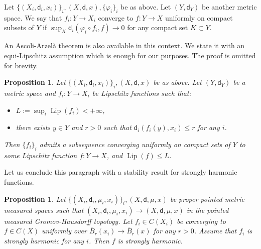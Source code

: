 \documentclass[JEP,XML,SOM,Unicode,published]{cedram}
\theoremstyle{plain}
\newtheorem{proposition}[theorem]{Proposition}
\theoremstyle{definition}
\let\phi\varphi
\DeclareMathOperator{\Lip}{Lip}
\newcommand{\dist}{\mathsf{d}}
\begin{document}
Let $\{(X_i,\dist_i,x_i)\}_i, (X,\dist,x),\{\phi_i\}_i$ be as above. Let $(Y,\dist_Y)$ be another metric space. We say that $f_i: Y\to X_i$ converge to $f: Y\to X$ uniformly on compact subsets of $Y$ if $\sup_K \dist_i(\phi_i \circ f_i,f) \to 0$ for any compact set $K \subset Y$.

An Ascoli-Arzelà theorem is also available in this context. We state it with an equi-Lipschitz assumption which is enough for our purposes. The proof is omitted for brevity.

\begin{proposition}\label{prop:AA2}
Let $\{(X_i,\dist_i,x_i)\}_i, (X,\dist,x)$ be as above. Let $(Y,\dist_Y)$ be a metric space and $f_i: Y\to X_i$ be Lipschitz functions such that:
\begin{itemize}
\item $L:=\sup_i \Lip(f_i) < +\infty$,
\item there exists $y\in Y$ and $r>0$ such that $\dist_i(f_i(y),x_i)\le r$ for any $i$.
\end{itemize} Then $\{f_i\}_i$ admits a subsequence converging uniformly on compact sets of $Y$ to some Lipschitz function $f:Y\to X$, and $\Lip(f) \le L$.
\end{proposition}

Let us conclude this paragraph with a stability result for strongly harmonic functions.

\begin{proposition}\label{prop:stabstrongharmonic}
Let $\{(X_i,\dist_i,\mu_i,x_i)\}_i, (X,\dist,\mu,x)$ be proper pointed metric measured spaces such that $(X_i,\dist_i,\mu_i,x_i) \to (X,\dist,\mu,x)$ in the pointed measured Gromov-Hausdorff topology. Let $f_i \in C(X_i)$ be converging to $f \in C(X)$ uniformly over $\overline{B}_r(x_i) \to \overline{B}_r(x)$ for any $r>0$. Assume that $f_i$ is strongly harmonic for any $i$. Then $f$ is strongly harmonic.
\end{proposition}
\end{document}
